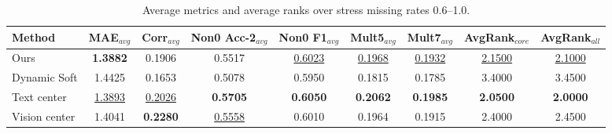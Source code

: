 \begin{table}[t]
\centering
\small
\begin{tabular}{lcccccccc}
\toprule
Method & MAE$_{avg}$ & Corr$_{avg}$ & Non0 Acc-2$_{avg}$ & Non0 F1$_{avg}$ & Mult5$_{avg}$ & Mult7$_{avg}$ & AvgRank$_{core}$ & AvgRank$_{all}$ \\
\midrule
Ours & \textbf{1.3882} & 0.1906 & 0.5517 & \underline{0.6023} & \underline{0.1968} & \underline{0.1932} & \underline{2.1500} & \underline{2.1000} \\
Dynamic Soft & 1.4425 & 0.1653 & 0.5078 & 0.5950 & 0.1815 & 0.1785 & 3.4000 & 3.4500 \\
Text center & \underline{1.3893} & \underline{0.2026} & \textbf{0.5705} & \textbf{0.6050} & \textbf{0.2062} & \textbf{0.1985} & \textbf{2.0500} & \textbf{2.0000} \\
Vision center & 1.4041 & \textbf{0.2280} & \underline{0.5558} & 0.6010 & 0.1964 & 0.1915 & 2.4000 & 2.4500 \\
\bottomrule
\end{tabular}
\caption{Average metrics and average ranks over stress missing rates 0.6--1.0.}
\label{tab:stress_avg_summary}
\end{table}